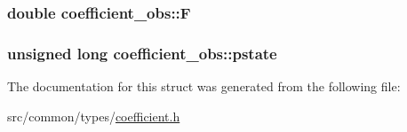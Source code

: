 \subsubsection[{\texorpdfstring{F}{F}}]{\setlength{\rightskip}{0pt plus 5cm}double coefficient\+\_\+obs\+::F}\hypertarget{structcoefficient__obs_a450b61c7f8ecd5cd3c3dd9281e5da992}{}\label{structcoefficient__obs_a450b61c7f8ecd5cd3c3dd9281e5da992}
\subsubsection[{\texorpdfstring{pstate}{pstate}}]{\setlength{\rightskip}{0pt plus 5cm}unsigned long coefficient\+\_\+obs\+::pstate}\hypertarget{structcoefficient__obs_adecb824d8a854272d74d11cce7952518}{}\label{structcoefficient__obs_adecb824d8a854272d74d11cce7952518}


The documentation for this struct was generated from the following file\+:\begin{DoxyCompactItemize}
\item 
src/common/types/\hyperlink{coefficient_8h}{coefficient.\+h}\end{DoxyCompactItemize}
